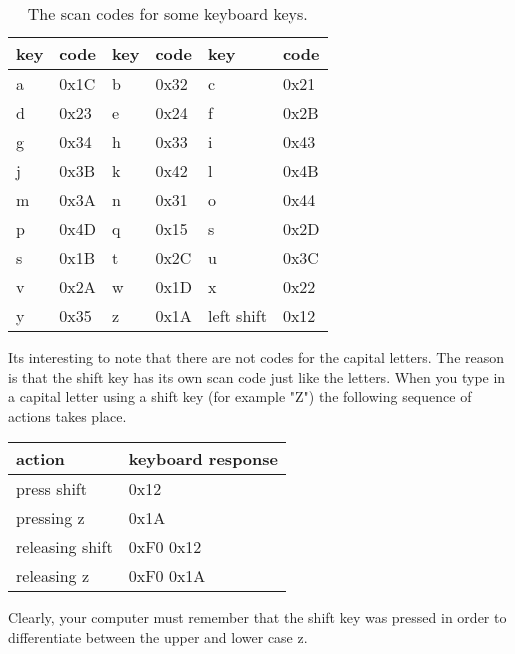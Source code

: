 \begin{table}
\begin{tabular}{l|l|l|l|l|l}
key & code	& key & code	& key & code \\ \hline \hline
a   & 0x1C	& b   & 0x32	& c   & 0x21	\\ \hline
d   & 0x23	& e   & 0x24	& f   & 0x2B	\\ \hline
g   & 0x34	& h   & 0x33	& i   & 0x43	\\ \hline
j   & 0x3B	& k   & 0x42	& l   & 0x4B	\\ \hline
m   & 0x3A	& n   & 0x31	& o   & 0x44	\\ \hline
p   & 0x4D	& q   & 0x15	& s   & 0x2D	\\ \hline
s   & 0x1B	& t   & 0x2C	& u   & 0x3C	\\ \hline
v   & 0x2A	& w   & 0x1D	& x   & 0x22	\\ \hline
y   & 0x35	& z   & 0x1A	& left shift & 0x12	\\ 
\end{tabular}
\caption{The scan codes for some keyboard keys.}
\label{table:keyboard}
\end{table}

Its interesting to note that there are not codes for the capital
letters.  The reason is that the shift key has its own scan
code just like the letters.  When you type in a capital letter
using a shift key (for example "Z") the following sequence of 
actions takes place.

\begin{tabular} {l|l}
action		&	keyboard response	\\ \hline \hline
press shift	&	0x12			\\ \hline
pressing z	&	0x1A			\\ \hline
releasing shift	&	0xF0 0x12		\\ \hline
releasing z	&	0xF0 0x1A		\\ 
\end{tabular}

Clearly, your computer must remember that the shift key was pressed 
in order to differentiate between the upper and lower case z.

